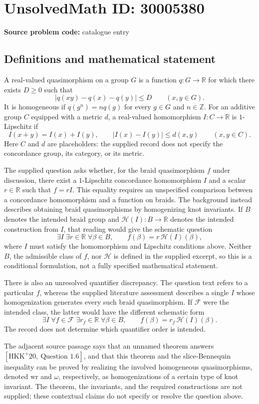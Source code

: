 \documentclass[11pt]{article}
\newcommand{\Z}{\mathbb{Z}}
\newcommand{\R}{\mathbb{R}}
\begin{document}
\section*{UnsolvedMath ID: 30005380}
\textbf{Source problem code:} catalogue entry
\subsection{Definitions and mathematical statement}
A real-valued quasimorphism on a group \(G\) is a function \(q:G\to\R\) for which there exists \(D\geq0\) such that
\[
|q(xy)-q(x)-q(y)|\leq D\qquad(x,y\in G).
\]
It is homogeneous if \(q(g^n)=nq(g)\) for every \(g\in G\) and \(n\in\Z\). For an additive group \(C\) equipped with a metric \(d\), a real-valued homomorphism \(I:C\to\R\) is \(1\)-Lipschitz if
\[
I(x+y)=I(x)+I(y),\qquad |I(x)-I(y)|\leq d(x,y)\qquad(x,y\in C).
\]
Here \(C\) and \(d\) are placeholders: the supplied record does not specify the concordance group, its category, or its metric.

The supplied question asks whether, for the braid quasimorphism \(f\) under discussion, there exist a \(1\)-Lipschitz concordance homomorphism \(I\) and a scalar \(r\in\R\) such that \(f=rI\). This equality requires an unspecified comparison between a concordance homomorphism and a function on braids. The background instead describes obtaining braid quasimorphisms by homogenizing knot invariants. If \(B\) denotes the intended braid group and \(\mathcal H(I):B\to\R\) denotes the intended construction from \(I\), that reading would give the schematic question
\[
\exists I\;\exists r\in\R\;\forall\beta\in B,
\qquad f(\beta)=r\,\mathcal H(I)(\beta),
\]
where \(I\) must satisfy the homomorphism and Lipschitz conditions above. Neither \(B\), the admissible class of \(f\), nor \(\mathcal H\) is defined in the supplied excerpt, so this is a conditional formulation, not a fully specified mathematical statement.

There is also an unresolved quantifier discrepancy. The question text refers to a particular \(f\), whereas the supplied literature assessment describes a single \(I\) whose homogenization generates every such braid quasimorphism. If \(\mathcal F\) were the intended class, the latter would have the different schematic form
\[
\exists I\;\forall f\in\mathcal F\;\exists r_f\in\R\;\forall\beta\in B,
\qquad f(\beta)=r_f\,\mathcal H(I)(\beta).
\]
The record does not determine which quantifier order is intended.

The adjacent source passage says that an unnamed theorem answers \([\mathrm{HKK}^{+}20,\ \text{Question }1.6]\), and that this theorem and the slice-Bennequin inequality can be proved by realizing the involved homogeneous quasimorphisms, denoted \(\mathrm{wr}\) and \(\omega\), respectively, as homogenizations of a certain type of knot invariant. The theorem, the invariants, and the required constructions are not supplied; these contextual claims do not specify or resolve the question above.
\end{document}
